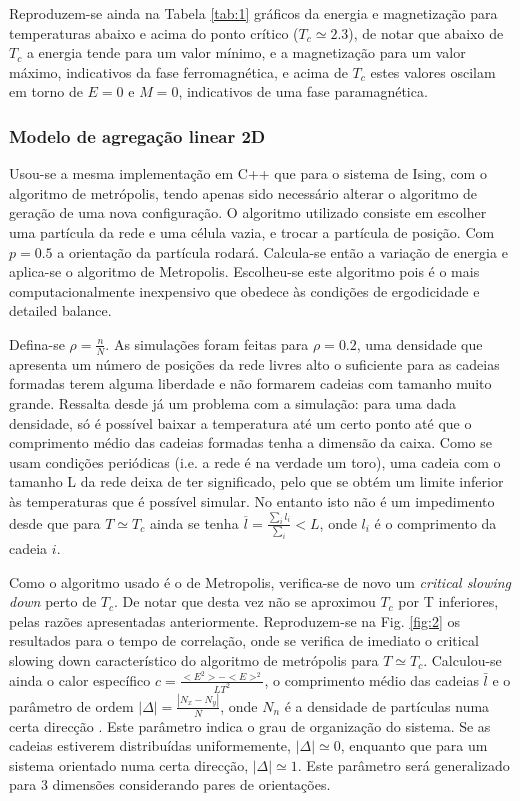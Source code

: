 \documentclass[a4paper,10pt]{article}
\begin{document}
\begin{multicols}{2}
Reproduzem-se ainda na Tabela \ref{tab:1} gráficos da energia e magnetização para temperaturas abaixo e acima do ponto crítico ($T_c\simeq2.3$), de notar que abaixo de $T_c$ a energia tende para um valor mínimo, e a magnetização para um valor máximo, indicativos da fase ferromagnética, e acima de $T_c$ estes valores oscilam em torno de $E=0$ e $M=0$, indicativos de uma fase paramagnética.

\subsubsection{Modelo de agregação linear 2D}
Usou-se a mesma implementação em C++ que para o sistema de Ising, com o algoritmo de metrópolis, tendo apenas sido necessário alterar o algoritmo de geração de uma nova configuração. O algoritmo utilizado consiste em escolher uma partícula da rede e uma célula vazia, e trocar a partícula de posição. Com $p=0.5$ a orientação da partícula rodará. Calcula-se então a variação de energia e aplica-se o algoritmo de Metropolis. Escolheu-se este algoritmo pois é o mais computacionalmente inexpensivo que obedece às condições de ergodicidade e detailed balance.

Defina-se $\rho = \frac{n}{N}$. As simulações foram feitas para $\rho = 0.2$, uma densidade que apresenta um número de posições da rede livres alto o suficiente para as cadeias formadas terem alguma liberdade e não formarem cadeias com tamanho muito grande. Ressalta desde já um problema com a simulação: para uma dada densidade, só é possível baixar a temperatura até um certo ponto até que o comprimento médio das cadeias formadas tenha a dimensão da caixa. Como se usam condições periódicas (i.e. a rede é na verdade um toro), uma cadeia com o tamanho L da rede deixa de ter significado, pelo que se obtém um limite inferior às temperaturas que é possível simular. No entanto isto não é um impedimento desde que para $T\simeq T_c$ ainda se tenha $\overline{l} = \frac{\sum_i l_i}{\sum_i} < L$, onde $l_i$ é o comprimento da cadeia $i$.

Como o algoritmo usado é o de Metropolis, verifica-se de novo um \textit{critical slowing down} perto de $T_c$. De notar que desta vez não se aproximou $T_c$ por T inferiores, pelas razões apresentadas anteriormente. Reproduzem-se na Fig. \ref{fig:2} os resultados para o tempo de correlação, onde se verifica de imediato o critical slowing down característico do algoritmo de metrópolis para $T\simeq T_c$. Calculou-se ainda o calor específico $c=\frac{<E^2>-<E>^2}{L T^2}$, o comprimento médio das cadeias $\bar{l}$ e o parâmetro de ordem $|\Delta| = \frac{|N_x - N_y|}{N}$, onde $N_n$ é a densidade de partículas numa certa direcção \cite{tavares}. Este parâmetro indica o grau de organização do sistema. Se as cadeias estiverem distribuídas uniformemente, $|\Delta| \simeq 0$, enquanto que para um sistema orientado numa certa direcção, $|\Delta| \simeq 1$. Este parâmetro será generalizado para 3 dimensões considerando pares de orientações.


\end{multicols}
\end{document}
